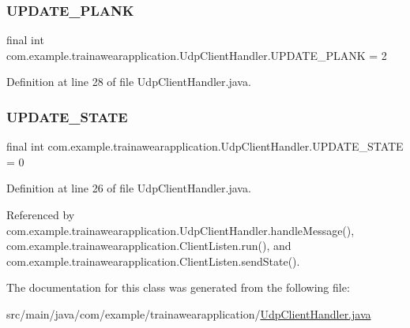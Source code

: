 \subsubsection{\texorpdfstring{UPDATE\_PLANK}{UPDATE\_PLANK}}
{\footnotesize\ttfamily final int com.\+example.\+trainawearapplication.\+Udp\+Client\+Handler.\+U\+P\+D\+A\+T\+E\+\_\+\+P\+L\+A\+NK = 2\hspace{0.3cm}{\ttfamily [static]}}



Definition at line 28 of file Udp\+Client\+Handler.\+java.

\mbox{\label{classcom_1_1example_1_1trainawearapplication_1_1_udp_client_handler_abb97ab46d1d8c23159f9ea1319425a5c}} 
\subsubsection{\texorpdfstring{UPDATE\_STATE}{UPDATE\_STATE}}
{\footnotesize\ttfamily final int com.\+example.\+trainawearapplication.\+Udp\+Client\+Handler.\+U\+P\+D\+A\+T\+E\+\_\+\+S\+T\+A\+TE = 0\hspace{0.3cm}{\ttfamily [static]}}



Definition at line 26 of file Udp\+Client\+Handler.\+java.



Referenced by com.\+example.\+trainawearapplication.\+Udp\+Client\+Handler.\+handle\+Message(), com.\+example.\+trainawearapplication.\+Client\+Listen.\+run(), and com.\+example.\+trainawearapplication.\+Client\+Listen.\+send\+State().



The documentation for this class was generated from the following file\+:\begin{DoxyCompactItemize}
\item 
src/main/java/com/example/trainawearapplication/\mbox{\hyperlink{_udp_client_handler_8java}{Udp\+Client\+Handler.\+java}}\end{DoxyCompactItemize}
